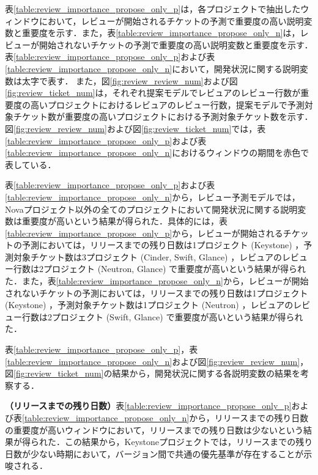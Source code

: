 \documentclass[submit]{ipsj}
\begin{document}
表\ref{table:review_importance_propose_only_p}は，各プロジェクトで抽出したウィンドウにおいて，レビューが開始されるチケットの予測で重要度の高い説明変数と重要度を示す．また，表\ref{table:review_importance_propose_only_n}は，レビューが開始されないチケットの予測で重要度の高い説明変数と重要度を示す．表\ref{table:review_importance_propose_only_p}および表\ref{table:review_importance_propose_only_n}において，開発状況に関する説明変数は太字で表す．
また，図\ref{fig:review_review_num}および図\ref{fig:review_ticket_num}は，それぞれ提案モデルでレビュアのレビュー行数が重要度の高いプロジェクトにおけるレビュアのレビュー行数，提案モデルで予測対象チケット数が重要度の高いプロジェクトにおける予測対象チケット数を示す．図\ref{fig:review_review_num}および図\ref{fig:review_ticket_num}では，表\ref{table:review_importance_propose_only_p}および表\ref{table:review_importance_propose_only_n}におけるウィンドウの期間を赤色で表している．

表\ref{table:review_importance_propose_only_p}および表\ref{table:review_importance_propose_only_n}から，レビュー予測モデルでは，Novaプロジェクト以外の全てのプロジェクトにおいて開発状況に関する説明変数は重要度が高いという結果が得られた．具体的には，表\ref{table:review_importance_propose_only_p}から，レビューが開始されるチケットの予測においては，リリースまでの残り日数は1プロジェクト (Keystone) ，予測対象チケット数は3プロジェクト (Cinder, Swift, Glance) ，レビュアのレビュー行数は2プロジェクト (Neutron, Glance) で重要度が高いという結果が得られた．また，表\ref{table:review_importance_propose_only_n}から，レビューが開始されないチケットの予測においては，リリースまでの残り日数は1プロジェクト (Keystone) ，予測対象チケット数は1プロジェクト (Neutron) ，レビュアのレビュー行数は2プロジェクト (Swift, Glance) で重要度が高いという結果が得られた．

表\ref{table:review_importance_propose_only_p}，表\ref{table:review_importance_propose_only_n}および図\ref{fig:review_review_num}，図\ref{fig:review_ticket_num}の結果から，開発状況に関する各説明変数の結果を考察する．

\textbf{（リリースまでの残り日数）}表\ref{table:review_importance_propose_only_p}および表\ref{table:review_importance_propose_only_n}から，リリースまでの残り日数の重要度が高いウィンドウにおいて，リリースまでの残り日数は少ないという結果が得られた．この結果から，Keystoneプロジェクトでは，リリースまでの残り日数が少ない時期において，バージョン間で共通の優先基準が存在することが示唆される．
\end{document}
